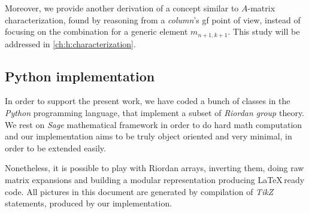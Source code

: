 Moreover, we provide another derivation of a concept similar to $A$-matrix characterization,
found by reasoning from a \emph{column}'s \ac{gf} point of view, instead of
focusing on the combination for a generic element $m_{n+1,k+1}$. This study will be
addressed in \autoref{ch:h:characterization}.

\subsection{Python implementation}

In order to support the present work, we have coded a bunch of classes in the
\emph{Python} programming language, that implement a subset of \emph{Riordan
group} theory. We rest on \emph{Sage} \cite{sage} mathematical framework in
order to do hard math computation and our implementation aims to be truly
object oriented and very minimal, in order to be extended easily. 

Nonetheless, it is possible to play with Riordan arrays, inverting them, doing
raw matrix expansions and building a modular representation producing
\LaTeX\,ready code.  All pictures in this document are generated by compilation
of \emph{TikZ} statements, produced by our implementation.

